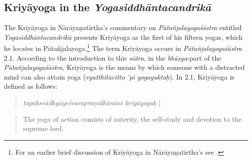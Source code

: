 \subsection{Kriyāyoga in the \textit{Yogasiddhāntacandrikā}}

The Kriyāyoga in Nārāyaṇatīrtha's commentary on \textit{Pātañjalayogaśāstra} entitled \textit{Yogasiddhāntacandrikā} presents Kriyāyoga as the first of his fifteen yogas, which he locates in Pātañjalayoga.\footnote{For an earlier brief discussion of Kriyāyoga in Nārāyaṇatīrtha's  see \citeauthor[2004: 62-66]{penna2004}.} The term Kriyāyoga occurs in \textit{Pātañjalayogaśāstra} 2.1. According to the introduction to this \textit{sūtra}, in the \textit{bhāṣya}-part of the \textit{Pātañjalayogaśāstra}, Kriyāyoga is the means by which someone with a distracted mind can also attain yoga (\textit{vyutthitacitto 'pi yogayuktaḥ}). In  2.1, Kriyāyoga is defined as follows:
\begin{quote}  
  \textit{tapaḥsvādhyāyeśvarapraṇidhānāni kriyāyogaḥ} |
\end{quote}
\begin{quote}
The yoga of action consists of auterity, the self-study and devotion to the supreme lord. 
\end{quote}

